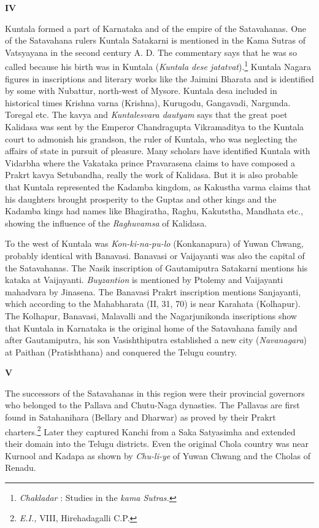 \documentclass{book}
\begin{document}
\medskip
\begin{center}
{\bf IV}
\end{center}
\smallskip

Kuntala formed a part of Karnataka and of the empire of the Satavahanas. One of the Satavahana rulers Kuntala Satakarni is mentioned in the Kama Sutras of Vatsyayana in the second century A. D. The commentary says that he was so called because his birth was in Kuntala ({\em Kuntala dese jatatvat}).\footnote[9]{{\em Chakladar} : Studies in the {\em kama Sutras.}} Kuntala Nagara figures in inscriptions and literary works like the Jaimini Bharata and is identified by some with Nubattur, north-west of Mysore. Kuntala desa included in historical times Krishna varna (Krishna), Kurugodu, Gangavadi, Nargunda. Toregal etc. The kavya and {\em Kuntalesvara dautyam} says that the great poet Kalidasa was sent by the Emperor Chandragupta Vikramaditya to the Kuntala court to admonish his grandson, the ruler of Kuntala, who was neglecting the affairs of state in pursuit of pleasure. Many scholars have identified Kuntala with Vidarbha where the Vakataka prince Pravarasena claims to have composed a Prakrt kavya Setubandha, really the work of Kalidasa. But it is also probable that Kuntala represented the Kadamba kingdom, as Kakustha varma claims that his daughters brought prosperity to the Guptas and other kings and the Kadamba kings had names like Bhagiratha, Raghu, Kakutstha, Mandhata etc., showing the influence of the {\em Raghuvamsa} of Kalidasa.

To the west of Kuntala was {\em Kon-ki-na-pu-lo} (Konkanapura) of Yuwan Chwang, probably identical with Banavasi. Banavasi or Vaijayanti was also the capital of the Satavahanas. The Nasik inscription of Gautamiputra Satakarni mentions his kataka at Vaijayanti. {\em Buyzantion} is mentioned by Ptolemy and Vaijayanti mahadvara by Jinasena. The Banavasi Prakrt inscription mentions Sanjayanti, which according to the Mahabharata (II, 31, 70) is near Karahata (Kolhapur). The Kolhapur, Banavasi, Malavalli and the Nagarjunikonda inscriptions show that Kuntala in Karnataka is the original home of the Satavahana family and after Gautamiputra, his son Vasishthiputra established a new city ({\em Navanagara}) at Paithan (Pratishthana) and conquered the Telugu country.

\medskip
\begin{center}
{\bf V}
\end{center}
\smallskip

The successors of the Satavahanas in this region were their provincial governors who belonged to the Pallava and Chutu-Naga dynasties. The Pallavas are first found in Satahanihara (Bellary and Dharwar) as proved by their Prakrt charters.\footnote[10]{{\em E.I.,} VIII, Hirehadagalli C.P.} Later they captured Kanchi from a Saka Satyasimha and extended their domain into the Telugu districts. Even the original Chola country was near Kurnool and Kadapa as shown by {\em Chu-li-ye} of Yuwan Chwang and the Cholas of Renadu.
\end{document}
